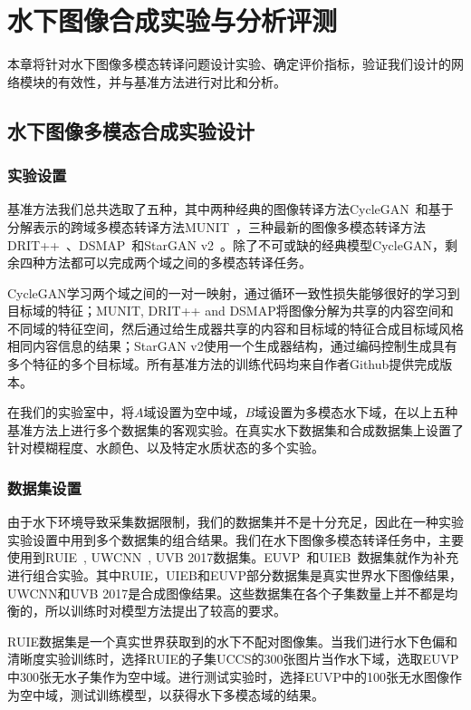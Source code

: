 \chapter{水下图像合成实验与分析评测}
本章将针对水下图像多模态转译问题设计实验、确定评价指标，验证我们设计的网络模块的有效性，并与基准方法进行对比和分析。

\section{水下图像多模态合成实验设计}
\subsection{实验设置}
基准方法我们总共选取了五种，其中两种经典的图像转译方法CycleGAN~\citep{zhu2017unpaired}和基于分解表示的跨域多模态转译方法MUNIT~\citep{huang2018multimodal}，三种最新的图像多模态转译方法DRIT++~\citep{lee2020drit++}、DSMAP~\citep{chang2020domain}和StarGAN v2~\cite{choi2020stargan}。除了不可或缺的经典模型CycleGAN，剩余四种方法都可以完成两个域之间的多模态转译任务。

CycleGAN学习两个域之间的一对一映射，通过循环一致性损失能够很好的学习到目标域的特征；MUNIT, DRIT++ and DSMAP将图像分解为共享的内容空间和不同域的特征空间，然后通过给生成器共享的内容和目标域的特征合成目标域风格相同内容信息的结果；StarGAN v2使用一个生成器结构，通过编码控制生成具有多个特征的多个目标域。所有基准方法的训练代码均来自作者Github提供完成版本。

在我们的实验室中，将$A$域设置为空中域，$B$域设置为多模态水下域，在以上五种基准方法上进行多个数据集的客观实验。在真实水下数据集和合成数据集上设置了针对模糊程度、水颜色、以及特定水质状态的多个实验。

\subsection{数据集设置}
由于水下环境导致采集数据限制，我们的数据集并不是十分充足，因此在一种实验实验设置中用到多个数据集的组合结果。我们在水下图像多模态转译任务中，主要使用到RUIE~\citep{liu2019real}, UWCNN~\citep{li2020underwater}, UVB 2017数据集。EUVP~\citep{islam2019fast}和UIEB~\citep{li2019underwater}数据集就作为补充进行组合实验。其中RUIE，UIEB和EUVP部分数据集是真实世界水下图像结果，UWCNN和UVB 2017是合成图像结果。这些数据集在各个子集数量上并不都是均衡的，所以训练时对模型方法提出了较高的要求。

RUIE数据集是一个真实世界获取到的水下不配对图像集。当我们进行水下色偏和清晰度实验训练时，选择RUIE的子集UCCS的300张图片当作水下域，选取EUVP中300张无水子集作为空中域。进行测试实验时，选择EUVP中的100张无水图像作为空中域，测试训练模型，以获得水下多模态域的结果。

